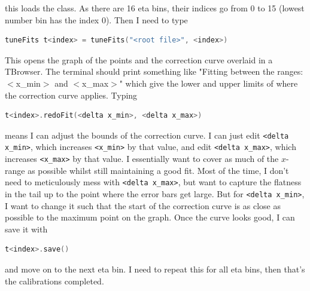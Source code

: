 this loads the class. As there are 16 eta bins, their indices go from 0 to 15 (lowest number bin has the index 0). Then I need to type

\begin{lstlisting}[belowskip=-0.7cm, language=C++, numbers=none]
tuneFits t<index> = tuneFits("<root file>", <index>)
\end{lstlisting}

This opens the graph of the points and the correction curve overlaid in a TBrowser. The terminal should print something like "Fitting between the ranges: $<$x\_min$>$ and $<$x\_max$>$" which give the lower and upper limits of where the correction curve applies. Typing

\begin{lstlisting}[belowskip=-0.7cm, language=C++, numbers=none]
t<index>.redoFit(<delta x_min>, <delta x_max>)
\end{lstlisting}

means I can adjust the bounds of the correction curve. I can just edit \texttt{<delta x\_min>}, which increases \texttt{<x\_min>} by that value, and edit \texttt{<delta x\_max>}, which increases \texttt{<x\_max>} by that value. I essentially want to cover as much of the $x$-range as possible whilst still maintaining a good fit. Most of the time, I don't need to meticulously mess with \texttt{<delta x\_max>}, but want to capture the flatness in the tail up to the point where the error bars get large. But for \texttt{<delta x\_min>}, I want to change it such that the start of the correction curve is as close as possible to the maximum point on the graph. Once the curve looks good, I can save it with

\begin{lstlisting}[belowskip=-0.7cm, language=C++, numbers=none]
t<index>.save()
\end{lstlisting}

and move on to the next eta bin. I need to repeat this for all eta bins, then that's the calibrations completed. 



